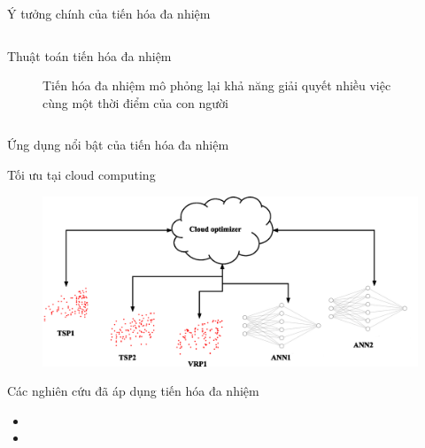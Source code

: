 \begin{frame}{Ý tưởng chính của tiến hóa đa nhiệm}
\begin{columns}
\begin{column}{0.5\textwidth}
\begin{block}{Thuật toán tiến hóa đa nhiệm}
\begin{figure}
                    \caption{Tiến hóa đa nhiệm mô phỏng lại khả năng giải quyết nhiều việc cùng một thời điểm của con người}
                    \label{fig:introduction:mto}
                \end{figure}
            \end{block}
        \end{column}
    \end{columns}
\end{frame}

\begin{frame}{Ứng dụng nổi bật của tiến hóa đa nhiệm}
    \begin{block}{Tối ưu tại cloud computing}
        \begin{figure}
            \centering
            \includegraphics[width=0.7\linewidth]{figure/introduction/cloud_optimizer.eps}
        \end{figure}
    \end{block}
    \begin{block}{Các nghiên cứu đã áp dụng tiến hóa đa nhiệm}
        \begin{itemize}
            \scriptsize
            \item {}
            \item {}
        \end{itemize}
    \end{block}
\end{frame}

